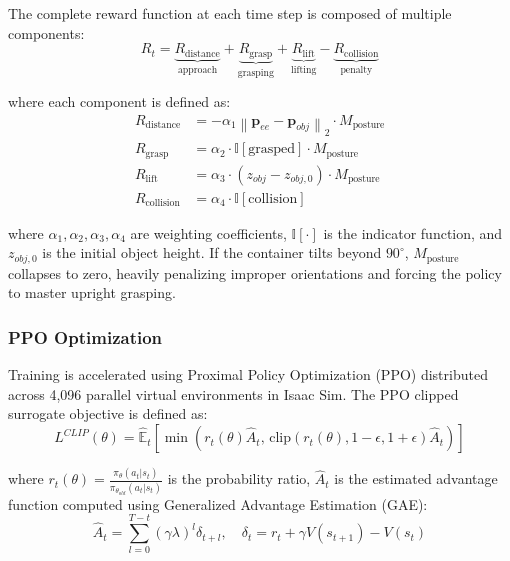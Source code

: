 The complete reward function at each time step is composed of multiple components:
\begin{equation}
    R_t = \underbrace{R_{\text{distance}}}_{\text{approach}} + \underbrace{R_{\text{grasp}}}_{\text{grasping}} + \underbrace{R_{\text{lift}}}_{\text{lifting}} - \underbrace{R_{\text{collision}}}_{\text{penalty}}
\end{equation}

where each component is defined as:
\begin{align}
    R_{\text{distance}} &= -\alpha_1 \left\| \mathbf{p}_{ee} - \mathbf{p}_{obj} \right\|_2 \cdot M_{\text{posture}} \\
    R_{\text{grasp}} &= \alpha_2 \cdot \mathbb{I}[\text{grasped}] \cdot M_{\text{posture}} \\
    R_{\text{lift}} &= \alpha_3 \cdot (z_{obj} - z_{obj,0}) \cdot M_{\text{posture}} \\
    R_{\text{collision}} &= \alpha_4 \cdot \mathbb{I}[\text{collision}]
\end{align}

where $\alpha_1, \alpha_2, \alpha_3, \alpha_4$ are weighting coefficients, $\mathbb{I}[\cdot]$ is the indicator function, and $z_{obj,0}$ is the initial object height. If the container tilts beyond $90^\circ$, $M_{\text{posture}}$ collapses to zero, heavily penalizing improper orientations and forcing the policy to master upright grasping.

\subsubsection{PPO Optimization}
\label{subsec:ppo}

Training is accelerated using Proximal Policy Optimization (PPO) distributed across 4,096 parallel virtual environments in Isaac Sim. The PPO clipped surrogate objective is defined as:
\begin{equation}
    L^{CLIP}(\theta) = \hat{\mathbb{E}}_t \left[ \min \left( r_t(\theta) \hat{A}_t, \, \text{clip}(r_t(\theta), 1-\epsilon, 1+\epsilon) \hat{A}_t \right) \right]
\end{equation}

where $r_t(\theta) = \frac{\pi_\theta(a_t|s_t)}{\pi_{\theta_{old}}(a_t|s_t)}$ is the probability ratio, $\hat{A}_t$ is the estimated advantage function computed using Generalized Advantage Estimation (GAE):
\begin{equation}
    \hat{A}_t = \sum_{l=0}^{T-t} (\gamma \lambda)^l \delta_{t+l}, \quad \delta_t = r_t + \gamma V(s_{t+1}) - V(s_t)
\end{equation}

